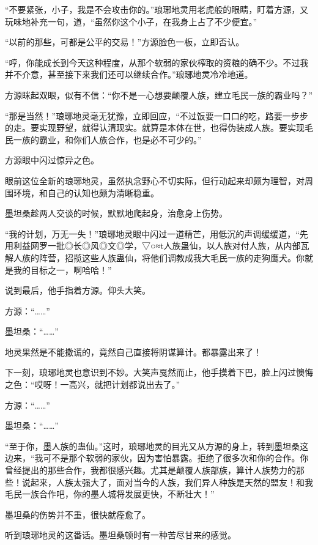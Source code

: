 
\begin{this_body}

“不要紧张，小子，我是不会攻击你的。”琅琊地灵用老虎般的眼睛，盯着方源，又玩味地补充一句，道，“虽然你这个小子，在我身上占了不少便宜。”

“以前的那些，可都是公平的交易！”方源脸色一板，立即否认。

“哼，你能成长到今天这种程度，从那个软弱的家伙榨取的资粮的确不少。不过我并不介意，甚至接下来我们还可以继续合作。”琅琊地灵冷冷地道。

方源眯起双眼，似有不信：“你不是一心想要颠覆人族，建立毛民一族的霸业吗？”

“那是当然！”琅琊地灵毫无犹豫，立即回应，“不过饭要一口口的吃，路要一步步的走。要实现野望，就得认清现实。就算是本体在世，也得伪装成人族。要实现毛民一族的霸业，和你们人族合作，也是必不可少的。”

方源眼中闪过惊异之色。

眼前这位全新的琅琊地灵，虽然执念野心不切实际，但行动起来却颇为理智，对周围环境，和自己的认知也颇为清晰稳重。

墨坦桑趁两人交谈的时候，默默地爬起身，治愈身上伤势。

“我的计划，万无一失！”琅琊地灵眼中闪过一道精芒，用低沉的声调缓缓道，“先用利益网罗一批◎长◎风◎文◎学，▽○≈t人族蛊仙，以人族对付人族，从内部瓦解人族的阵营，招揽这些人族蛊仙，将他们调教成我大毛民一族的走狗鹰犬。你就是我的目标之一，啊哈哈！”

说到最后，他手指着方源。仰头大笑。

方源：“……”

墨坦桑：“……”

地灵果然是不能撒谎的，竟然自己直接将阴谋算计。都暴露出来了！

下一刻，琅琊地灵也意识到不妙。大笑声戛然而止，他手摸着下巴，脸上闪过懊悔之色：“哎呀！一高兴，就把计划都说出去了。”

方源：“……”

墨坦桑：“……”

“至于你，墨人族的蛊仙。”这时，琅琊地灵的目光又从方源的身上，转到墨坦桑这边来，“我可不是那个软弱的家伙，因为害怕暴露。拒绝了很多次和你的合作。你曾经提出的那些合作，我都很感兴趣。尤其是颠覆人族部族，算计人族势力的那些！说起来，人族太强大了，面对当今的人族，我们异人种族是天然的盟友！和我毛民一族合作吧，你的墨人城将发展更快，不断壮大！”

墨坦桑的伤势并不重，很快就痊愈了。

听到琅琊地灵的这番话。墨坦桑顿时有一种苦尽甘来的感觉。


\end{this_body}
